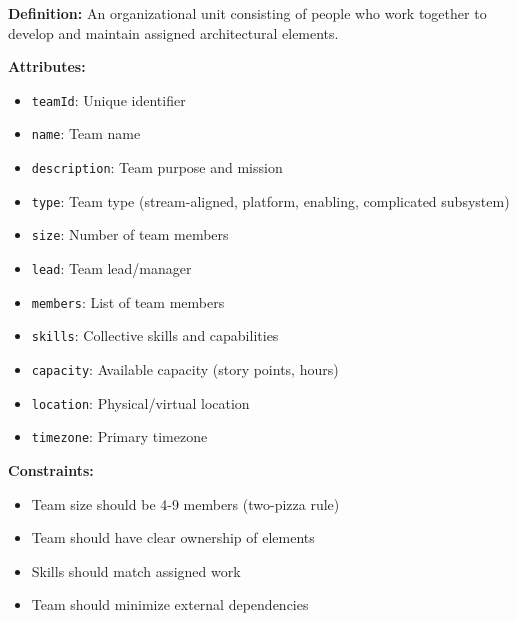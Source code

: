 \documentclass[11pt,letterpaper]{article}
\begin{document}
\begin{definitionbox}
\textbf{Definition:} An organizational unit consisting of people who work together to develop and maintain assigned architectural elements.

\textbf{Attributes:}
\begin{itemize}[nosep]
    \item \texttt{teamId}: Unique identifier
    \item \texttt{name}: Team name
    \item \texttt{description}: Team purpose and mission
    \item \texttt{type}: Team type (stream-aligned, platform, enabling, complicated subsystem)
    \item \texttt{size}: Number of team members
    \item \texttt{lead}: Team lead/manager
    \item \texttt{members}: List of team members
    \item \texttt{skills}: Collective skills and capabilities
    \item \texttt{capacity}: Available capacity (story points, hours)
    \item \texttt{location}: Physical/virtual location
    \item \texttt{timezone}: Primary timezone
\end{itemize}

\textbf{Constraints:}
\begin{itemize}[nosep]
    \item Team size should be 4-9 members (two-pizza rule)
    \item Team should have clear ownership of elements
    \item Skills should match assigned work
    \item Team should minimize external dependencies
\end{itemize}
\end{definitionbox}
\end{document}
